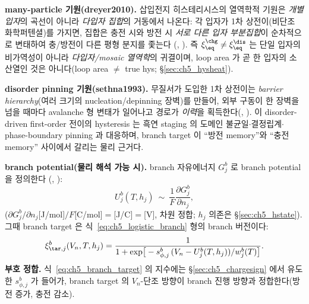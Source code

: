\textbf{many-particle 기원(dreyer2010).} 삽입전지 히스테리시스의 열역학적 기원은 \emph{개별 입자}의 곡선이
아니라 \emph{다입자 집합}의 거동에서 나온다: 각 입자가 1차 상전이(비단조 화학퍼텐셜)를 가지면, 집합은 충전 시와
방전 시 \emph{서로 다른 입자 부분집합}이 순차적으로 변태하여 충/방전이 다른 평형 분지를 좇는다
(\cite{dreyer2010}, ). 즉 $\xi_{\eq}^{\chg}\ne\xi_{\eq}^{\dis}$ 는 단일 입자의 비가역성이 아니라
\emph{다입자/mosaic 열역학}의 귀결이며, loop area 가 곧 한 입자의 소산열인 것은 아니다(loop area $\ne$ true
hys; \S\ref{sec:ch5_hysheat}).

\textbf{disorder pinning 기원(sethna1993).} 무질서가 도입한 1차 상전이는 \emph{barrier hierarchy}(여러
크기의 nucleation/depinning 장벽)를 만들어, 외부 구동이 한 장벽을 넘을 때마다 avalanche 형 변태가 일어나고
경로가 \emph{이력}을 획득한다(\cite{sethna1993}, ). 이 disorder-driven first-order 전이의 hysteresis
는 흑연 staging 의 도메인 불균일$\cdot$결정립계$\cdot$phase-boundary pinning 과 대응하며, branch target 이
``방전 memory''와 ``충전 memory'' 사이에서 갈리는 물리 근거다.

\textbf{branch potential(물리 해석 가능 시).} branch 자유에너지 $G_j^b$ 로 branch potential 을 정의한다
(\cite{dreyer2010,sethna1993}, ):
\begin{equation}
U_j^b(T,h_j)\ \sim\ \frac{1}{F}\frac{\partial G_j^b}{\partial n_j},
\label{eq:ch5_branch_potential}
\end{equation}
($\partial G_j^b/\partial n_j$[J/mol]$/F$[C/mol]$=$[J/C]$=$[V], 차원 정합; $h_j$ 의존은 \S\ref{sec:ch5_hstate}).
그때 branch target 은 식~\eqref{eq:ch5_logistic_branch} 형의 branch 버전이다:
\begin{equation}
\xi_{\tar,j}^b(V_n,T,h_j)=\frac{1}{1+\exp\!\big[-s_{\phi,j}^b\,(V_n-U_j^b(T,h_j))/w_j^b(T)\big]}.
\label{eq:ch5_branch_target}
\end{equation}
\textbf{부호 정합.} 식~\eqref{eq:ch5_branch_target} 의 지수에는 \S\ref{sec:ch5_chargesign} 에서 유도한
$s_{\phi,j}^b$ 가 들어가, branch target 의 $V_n$-단조 방향이 branch 진행 방향과 정합한다(방전 증가, 충전 감소).

